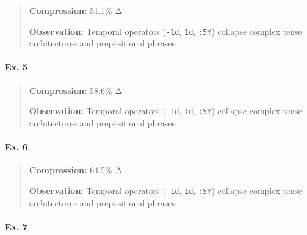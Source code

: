 \begin{quote}
\textbf{Compression:} 51.1\% Δ

\textbf{Observation:} Temporal operators (\texttt{-1d}, \texttt{1d},
\texttt{:5Y}) collapse complex tense architectures and prepositional
phrases.
\end{quote}

\paragraph{Ex. 5}\label{ex.-5}

\begin{Shaded}
\begin{Highlighting}[]
\end{Highlighting}
\end{Shaded}

\begin{quote}
\textbf{Compression:} 58.6\% Δ

\textbf{Observation:} Temporal operators (\texttt{-1d}, \texttt{1d},
\texttt{:5Y}) collapse complex tense architectures and prepositional
phrases.
\end{quote}

\paragraph{Ex. 6}\label{ex.-6}

\begin{Shaded}
\begin{Highlighting}[]
\end{Highlighting}
\end{Shaded}

\begin{quote}
\textbf{Compression:} 64.5\% Δ

\textbf{Observation:} Temporal operators (\texttt{-1d}, \texttt{1d},
\texttt{:5Y}) collapse complex tense architectures and prepositional
phrases.
\end{quote}

\paragraph{Ex. 7}\label{ex.-7}

